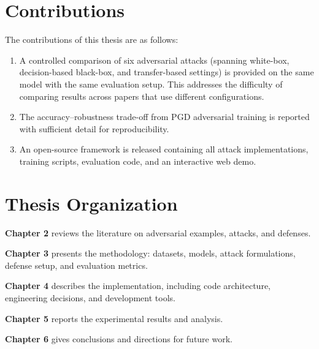 \section{Contributions}

The contributions of this thesis are as follows:

\begin{enumerate}
    \item A controlled comparison of six adversarial attacks (spanning white-box, decision-based black-box, and transfer-based settings) is provided on the same model with the same evaluation setup. This addresses the difficulty of comparing results across papers that use different configurations.
    \item The accuracy--robustness trade-off from PGD adversarial training is reported with sufficient detail for reproducibility.
    \item An open-source framework is released containing all attack implementations, training scripts, evaluation code, and an interactive web demo.
\end{enumerate}

\section{Thesis Organization}

\textbf{Chapter 2} reviews the literature on adversarial examples, attacks, and defenses.

\textbf{Chapter 3} presents the methodology: datasets, models, attack formulations, defense setup, and evaluation metrics.

\textbf{Chapter 4} describes the implementation, including code architecture, engineering decisions, and development tools.

\textbf{Chapter 5} reports the experimental results and analysis.

\textbf{Chapter 6} gives conclusions and directions for future work.

